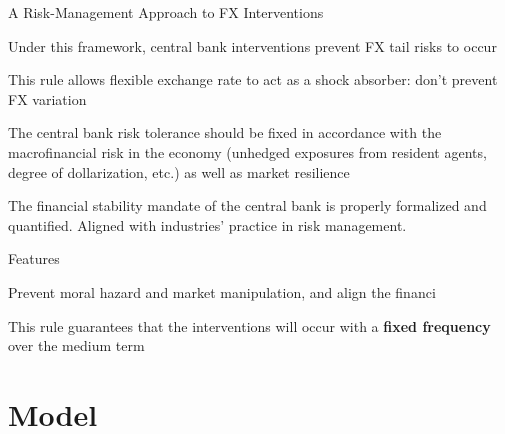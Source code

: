 \documentclass{beamer}
\newenvironment{largeitemize}{\itemize\addtolength{\itemsep}{10pt}}{\enditemize}
\newenvironment{largeenumerate}{\enumerate\addtolength{\itemsep}{10pt}}{\endenumerate}
\begin{document}
\begin{frame}{A Risk-Management Approach to FX Interventions}
  \begin{largeitemize}
    \item Under this framework, central bank interventions prevent FX tail
      risks to occur
    \item This rule allows flexible exchange rate to act as a shock absorber:
      don't prevent FX variation 
    \item The central bank risk tolerance should be fixed in accordance with the
      macrofinancial risk in the economy (unhedged exposures from resident agents, degree of
      dollarization, etc.) as well as market resilience
    \item The financial stability mandate of the central bank is properly
      formalized and quantified. Aligned with industries' practice in risk management.
  \end{largeitemize}
  
\end{frame}


\begin{frame}{Features}
  \begin{largeenumerate}
    \item Prevent moral hazard and market manipulation, and align the financi
    
    \item This rule guarantees that the interventions will occur with a \textbf{fixed
        frequency} over the medium term
    \item 
  \end{largeenumerate}
  
\end{frame}





\section{Model}
\end{document}
